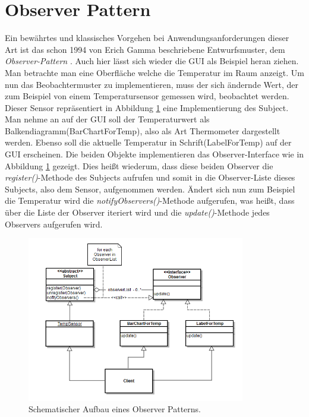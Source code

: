 \section{Observer Pattern}
Ein bewährtes und klassisches Vorgehen bei Anwendungsanforderungen dieser Art ist das schon 1994 von Erich Gamma beschriebene Entwurfsmuster, dem \textit{Observer-Pattern} \cite{Gamma.2011}. Auch hier lässt sich wieder die GUI als Beispiel heran ziehen. Man betrachte man eine Oberfläche welche die Temperatur im Raum anzeigt. Um nun das Beobachtermuster zu implementieren, muss der sich ändernde Wert, der zum Beispiel von einem Temperatursensor gemessen wird, beobachtet werden. Dieser Sensor repräsentiert in Abbildung \ref{pic:observerpattern} eine Implementierung des Subject. Man nehme an auf der GUI soll der Temperaturwert als Balkendiagramm(BarChartForTemp), also als Art Thermometer dargestellt werden. Ebenso soll die aktuelle Temperatur in Schrift(LabelForTemp) auf der GUI erscheinen. Die beiden Objekte implementieren das Observer-Interface wie in Abbildung \ref{pic:observerpattern} gezeigt. Dies heißt wiederum, dass diese beiden Observer die \textit{register()}-Methode des Subjects aufrufen und somit in die Observer-Liste dieses Subjects, also dem Sensor, aufgenommen werden. Ändert sich nun zum Beispiel die Temperatur wird die \textit{notifyObservers()}-Methode aufgerufen, was heißt, dass über die Liste der Observer iteriert wird und die \textit{update()}-Methode jedes Observers aufgerufen wird.
\begin{figure}[hbt]
	\centering
	\includegraphics[width=0.85\textwidth]{Abb/observerpattern_self}
	\caption{Schematischer Aufbau eines Observer Patterns.}
	\label{pic:observerpattern}
\end{figure}
